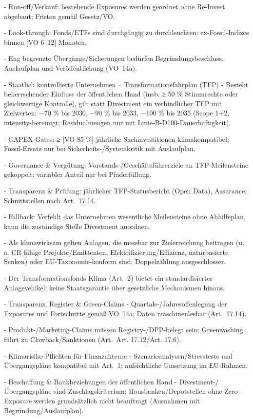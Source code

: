 \documentclass[12pt,a4paper]{scrartcl}
\begin{document}
- Run-off/Verkauf: bestehende Exposures werden geordnet ohne Re-Invest abgebaut; Fristen gemäß Gesetz/VO.

- Look-through: Fonds/ETFs sind durchgängig zu durchleuchten; ex-Fossil-Indizes binnen [VO 6--12] Monaten.

- Eng begrenzte Übergänge/Sicherungen bedürfen Begründungsbeschluss, Auslaufplan und Veröffentlichung (VO 14a).

- Staatlich kontrollierte Unternehmen -- Transformationsfahrplan (TFP)
- Besteht beherrschender Einfluss der öffentlichen Hand (insb. ≥ 50 \% Stimmrechte oder gleichwertige Kontrolle), gilt statt Divestment ein verbindlicher TFP mit Zielwerten: −70 \% bis 2030, −90 \% bis 2033, −100 \% bis 2035 (Scope 1+2, intensity-bereinigt; Residualmengen nur mit Linie-B-D100-Dauerhaftigkeit).

- CAPEX-Gates: ≥ [VO 85 \%] jährliche Sachinvestitionen klimakompatibel; Fossil-Ersatz nur bei Sicherheits-/Systemkritik mit Auslaufplan.

- Governance \& Vergütung: Vorstands-/Geschäftsführerziele an TFP-Meilensteine gekoppelt; variabler Anteil nur bei Pfaderfüllung.

- Transparenz \& Prüfung: jährlicher TFP-Statusbericht (Open Data), Assurance; Schnittstellen nach Art. 17.14.

- Fallback: Verfehlt das Unternehmen wesentliche Meilensteine ohne Abhilfeplan, kann die zuständige Stelle Divestment anordnen.

- Als klimawirksam gelten Anlagen, die messbar zur Zielerreichung beitragen (u. a. CR-fähige Projekte/Emittenten, Elektrifizierung/Effizienz, naturbasierte Senken) oder EU-Taxonomie-konform sind; Doppelzählung ausgeschlossen.

- Der Transformationsfonds Klima (Art. 2) bietet ein standardisiertes Anlagevehikel; keine Staatsgarantie über gesetzliche Mechanismen hinaus.

- Transparenz, Register \& Green-Claims
- Quartals-/Jahresoffenlegung der Exposures und Fortschritte gemäß VO 14a; Daten maschinenlesbar (Art. 17.14).

- Produkt-/Marketing-Claims müssen Registry-/DPP-belegt sein; Greenwashing führt zu Clawback/Sanktionen (Art. Art. 17.12/Art. 17.6).

- Klimarisiko-Pflichten für Finanzakteure
- Szenarioanalysen/Stresstests und Übergangspläne kompatibel mit Art. 1; aufsichtliche Umsetzung im EU-Rahmen.

- Beschaffung \& Bankbeziehungen der öffentlichen Hand
- Divestment-/Übergangspläne sind Zuschlagskriterium; Hausbanken/Depotstellen ohne Zero-Exposure werden grundsätzlich nicht beauftragt (Ausnahmen mit Begründung/Auslaufplan).
\end{document}
